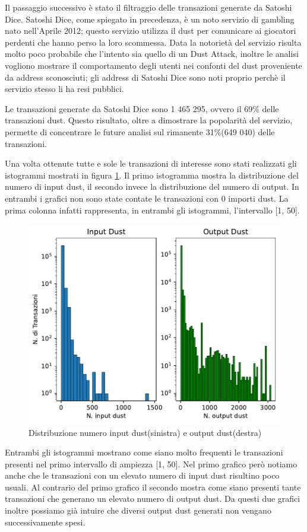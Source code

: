 Il passaggio successivo è stato il filtraggio delle transazioni generate da Satoshi Dice. Satoshi Dice, come spiegato in precedenza, è un noto servizio di gambling nato nell'Aprile 2012; questo servizio utilizza il dust per comunicare ai giocatori perdenti che hanno perso la loro scommessa. Data la notorietà del servizio risulta molto poco probabile che l'intento sia quello di un Dust Attack, inoltre le analisi vogliono mostrare il comportamento degli utenti nei confonti del dust proveniente da address sconosciuti; gli address di Satoshi Dice sono noti proprio perchè il servizio stesso li ha resi pubblici.

Le transazioni generate da Satoshi Dice sono 1 465 295, ovvero il 69\% delle transazioni dust. Questo risultato, oltre a dimostrare la popolarità del servizio, permette di concentrare le future analisi sul rimanente 31\%(649 040) delle transazioni.

Una volta ottenute tutte e sole le transazioni di interesse sono stati realizzati gli istogrammi mostrati in figura \ref{fig:dust_distribuzione}. Il primo istogramma mostra la distribuzione del numero di input dust, il secondo invece la distribuzione del numero di output. In entrambi i grafici non sono state contate le transazioni con 0 importi dust. La prima colonna infatti rappresenta, in entrambi gli istogrammi, l'intervallo [1, 50].
\begin{figure}[h!]
    \centering
    \includegraphics[scale=0.9]{Grafici/distribuzione_dust.pdf}
    \caption{Distribuzione numero input dust(sinistra) e output dust(destra)}
    \label{fig:dust_distribuzione}
\end{figure}
\FloatBarrier 
Entrambi gli istogrammi mostrano come siano molto frequenti le transazioni presenti nel primo intervallo di ampiezza [1, 50]. Nel primo grafico però notiamo anche che le transazioni con un elevato numero di input dust risultino poco usuali. Al contrario del primo grafico il secondo mostra come siano presenti tante transazioni che generano un elevato numero di output dust. Da questi due grafici inoltre possiamo già intuire che diversi output dust generati non vengano successivamente spesi.

